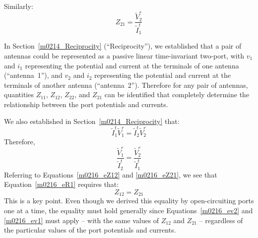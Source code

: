 Similarly:
%
\begin{equation}
Z_{21} = \frac{\widetilde{V}_2^r}{\widetilde{I}_1^t}
\label{m0216_eZ21}
\end{equation}

In Section~\ref{m0214_Reciprocity} (``Reciprocity''), we established that a pair of antennas could be represented as a passive linear time-invariant two-port, with 
$v_1$ and $i_1$ representing the potential and current at the terminals of one antenna (``antenna~1''), and 
$v_2$ and $i_2$ representing the potential and current at the terminals of another antenna (``antenna~2'').
Therefore for any pair of antennas, quantities $Z_{11}$, $Z_{12}$, $Z_{22}$, and $Z_{21}$ can be identified that completely determine the relationship between the port potentials and currents.

We also established in Section~\ref{m0214_Reciprocity} that:
%
\begin{equation}
\widetilde{I}_1^t \widetilde{V}_1^r = \widetilde{I}_2^t \widetilde{V}_2^r
\label{m0216_eRIV}
\end{equation}
%
Therefore,
%
\begin{equation}
\frac{\widetilde{V}_1^r}{\widetilde{I}_2^t} = \frac{\widetilde{V}_2^r}{\widetilde{I}_1^t}
\label{m0216_eR1}
\end{equation}
%
Referring to Equations~\ref{m0216_eZ12} and \ref{m0216_eZ21}, we see that Equation~\ref{m0216_eR1} requires that:
%
\begin{equation}
Z_{12} = Z_{21}
\end{equation}
%
This is a key point.
Even though we derived this equality by open-circuiting ports one at a time, the equality must hold generally since Equations~\ref{m0216_ev2} and \ref{m0216_ev1} must apply -- with the same values of $Z_{12}$ and $Z_{21}$ -- regardless of the particular values of the port potentials and currents.

